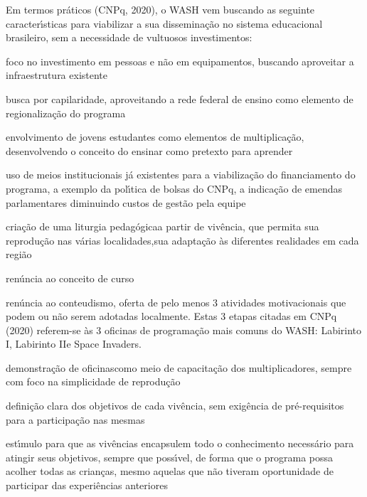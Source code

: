 \documentclass[
12pt,		%
openright,	%
twoside,  %
a4paper,			%
chapter=TITLE,		%
english,			%
french,				%
spanish,			%
brazil				%
]{USPSC-classe/USPSC}
\begin{document}
Em termos pr\'aticos  (CNPq, 2020), o WASH vem buscando as seguinte caracter\'{\i}sticas para viabilizar a sua dissemina\c{c}\~ao no sistema educacional brasileiro, sem a necessidade de vultuosos investimentos:











\begin{alineas}
\item \textquotedbl foco no investimento em pessoas e n\~ao em equipamentos, buscando aproveitar a infraestrutura existente\textquotedbl 
\item \textquotedbl busca por capilaridade, aproveitando a rede federal de ensino como elemento de regionaliza\c{c}\~ao do programa\textquotedbl 
\item \textquotedbl envolvimento de jovens estudantes como elementos de multiplica\c{c}\~ao, desenvolvendo o conceito do ensinar como pretexto para aprender\textquotedbl 
\item \textquotedbl uso de meios institucionais j\'a existentes para a viabiliza\c{c}\~ao do financiamento do programa, a exemplo da pol\'{\i}tica de bolsas do CNPq, a indica\c{c}\~ao de emendas parlamentares diminuindo custos de gest\~ao pela equipe\textquotedbl 
\item \textquotedbl cria\c{c}\~ao de uma  \textquotedbl liturgia pedag\'ogica\textquotedbl  a partir de viv\^encia, que permita sua reprodu\c{c}\~ao nas v\'arias localidades,sua adapta\c{c}\~ao \`as diferentes realidades em cada regi\~ao\textquotedbl 
\item \textquotedbl ren\'uncia ao conceito de curso\textquotedbl 
\item \textquotedbl ren\'uncia ao conteudismo, oferta de pelo menos 3  atividades motivacionais que podem ou n\~ao serem adotadas localmente\textquotedbl . Estas 3 etapas citadas em  CNPq (2020) referem-se \`as 3 oficinas de programa\c{c}\~ao mais comuns do WASH: \textquotedbl Labirinto I\textquotedbl , \textquotedbl Labirinto II\textquotedbl  e \textquotedbl Space Invaders\textquotedbl .
\item \textquotedbl demonstra\c{c}\~ao de oficinas\textquotedbl  como meio de capacita\c{c}\~ao dos multiplicadores, sempre com foco na
simplicidade de reprodu\c{c}\~ao\textquotedbl 
\item \textquotedbl defini\c{c}\~ao clara dos objetivos de cada viv\^encia, sem exig\^encia de pr\'e-requisitos para a participa\c{c}\~ao nas mesmas\textquotedbl 
\item \textquotedbl est\'{\i}mulo para que as viv\^encias encapsulem todo o conhecimento necess\'ario para  atingir  seus objetivos, sempre que poss\'{\i}vel, de forma que o programa possa acolher todas as crian\c{c}as, mesmo aquelas que n\~ao tiveram oportunidade de participar das experi\^encias anteriores\textquotedbl 
\end{alineas}
\end{document}
